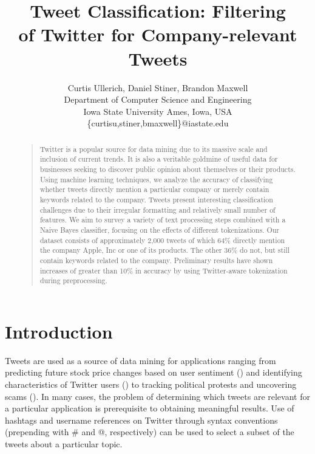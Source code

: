 \documentclass[letterpaper]{article}
\begin{document}
\title{Tweet Classification: Filtering \\ of Twitter for Company-relevant Tweets}
\author{
Curtis Ullerich, Daniel Stiner, Brandon Maxwell\\
Department of Computer Science and Engineering\\
Iowa State University
Ames, Iowa, USA\\
\{curtisu,stiner,bmaxwell\}@iastate.edu\\
}
\maketitle
\begin{abstract}
\begin{quote}
Twitter is a popular source for data mining due to its massive scale and inclusion of current trends. It is also a veritable goldmine of useful data for businesses seeking to discover public opinion about themselves or their products. Using machine learning techniques, we analyze the accuracy of classifying whether tweets directly mention a particular company or merely contain keywords related to the company. Tweets present interesting classification challenges due to their irregular formatting and relatively small number of features.
We aim to survey a variety of text processing steps combined with a Naive Bayes classifier, focusing on the effects of different tokenizations. Our dataset consists of approximately 2,000 tweets of which 64\% directly mention the company Apple, Inc or one of its products. The other 36\% do not, but still contain keywords related to the company. Preliminary results have shown increases of greater than 10\% in accuracy by using Twitter-aware tokenization during preprocessing.\\
\end{quote}
\end{abstract}

\section{Introduction}
Tweets are used as a source of data mining for applications ranging from predicting future stock price changes based on user sentiment (\citeauthor{Ruiz}) and identifying characteristics of Twitter users (\citeauthor{conf/icwsm/PennacchiottiP11}) to tracking political protests and uncovering scams (\citeauthor{ICWSM101540}).
In many cases, the problem of determining which tweets are relevant for a particular application is prerequisite to obtaining meaningful results. Use of hashtags and username references on Twitter through syntax conventions (prepending with \# and @, respectively) can be used to select a subset of the tweets about a particular topic. 
\end{document}
